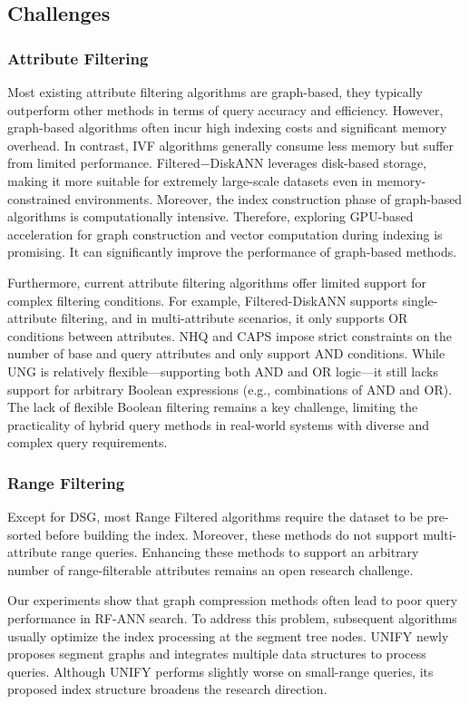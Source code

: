 \documentclass[sigconf, nonacm]{acmart}
\begin{document}
\begin{sloppypar}
\subsection{Challenges}
\subsubsection{\textbf{Attribute Filtering}}
Most existing attribute filtering algorithms are graph-based, %
they typically outperform other methods in terms of query accuracy and efficiency. However, graph-based algorithms often incur high indexing costs and significant memory overhead. In contrast, IVF algorithms  generally consume less memory but suffer from limited performance. Filtered−DiskANN leverages disk-based storage, making it more suitable for extremely large-scale datasets even in memory-constrained environments. Moreover, the index construction phase of graph-based algorithms is computationally intensive. Therefore, exploring GPU-based acceleration for graph construction and vector computation during indexing is promising. It can significantly improve the performance of graph-based methods.


Furthermore, current attribute filtering algorithms offer limited support for complex filtering conditions. For example, Filtered-DiskANN  supports single-attribute filtering, and in multi-attribute scenarios, it only supports OR conditions between attributes. 
NHQ and CAPS impose strict constraints on the number of base and query attributes and only support AND conditions. While UNG is relatively flexible—supporting both AND and OR logic—it still lacks support for arbitrary Boolean expressions (e.g., combinations of AND and OR). The lack of flexible Boolean filtering remains a key challenge, limiting the practicality of hybrid query methods in real-world systems with diverse and complex query requirements.

\subsubsection{\textbf{Range Filtering}}

Except for DSG, most Range Filtered algorithms require the dataset to be pre-sorted before building the index. Moreover, these methods do not support multi-attribute range queries. Enhancing these methods to support an arbitrary number of range-filterable attributes remains an open research challenge.

Our experiments show that graph compression methods often lead to poor query performance in RF-ANN search. To address this problem, subsequent algorithms usually optimize the index processing at the segment tree nodes. UNIFY newly proposes segment graphs and integrates multiple data structures to process queries. Although UNIFY performs slightly worse on small-range queries, its proposed index structure broadens the research direction.


\end{sloppypar}
\end{document}
